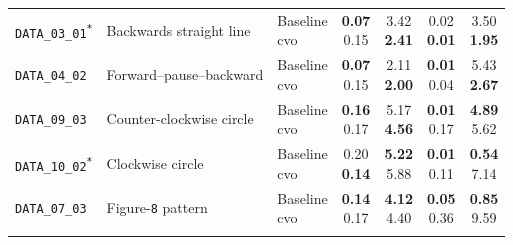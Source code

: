 \documentclass[report.tex]{subfiles}
\begin{document}
\begin{table}[!htbp]
\begin{tabularx}{\textwidth}{
            >{\raggedright\arraybackslash}m{1.55cm}
            >{\raggedright\arraybackslash}X
            l
            cccc
        }
            \texttt{DATA\_03\_01\textsuperscript{*}}
            & Backwards straight line
            & \makecell[l]{Baseline\\\gls{cvo}}
            & \makecell{\textbf{0.07}\\0.15}
            & \makecell{3.42\\\textbf{2.41}}
            & \makecell{0.02\\\textbf{0.01}}
            & \makecell{3.50\\\textbf{1.95}} \\
            \addlinespace

            \texttt{DATA\_04\_02}
            & Forward--pause--backward
            & \makecell[l]{Baseline\\\gls{cvo}}
            & \makecell{\textbf{0.07}\\0.15}
            & \makecell{2.11\\\textbf{2.00}}
            & \makecell{\textbf{0.01}\\0.04}
            & \makecell{5.43\\\textbf{2.67}} \\
            \addlinespace

            \texttt{DATA\_09\_03}
            & Counter-clockwise circle
            & \makecell[l]{Baseline\\\gls{cvo}}
            & \makecell{\textbf{0.16}\\0.17}
            & \makecell{5.17\\\textbf{4.56}}
            & \makecell{\textbf{0.01}\\0.17}
            & \makecell{\textbf{4.89}\\5.62} \\
            \addlinespace

            \texttt{DATA\_10\_02\textsuperscript{*}}
            & Clockwise circle
            & \makecell[l]{Baseline\\\gls{cvo}}
            & \makecell{0.20\\\textbf{0.14}}
            & \makecell{\textbf{5.22}\\5.88}
            & \makecell{\textbf{0.01}\\0.11}
            & \makecell{\textbf{0.54}\\7.14} \\
            \addlinespace

            \texttt{DATA\_07\_03}
            & Figure-\texttt{8} pattern
            & \makecell[l]{Baseline\\\gls{cvo}}
            & \makecell{\textbf{0.14}\\0.17}
            & \makecell{\textbf{4.12}\\4.40}
            & \makecell{\textbf{0.05}\\0.36}
            & \makecell{\textbf{0.85}\\9.59} \\
            \addlinespace


\end{tabularx}
\end{table}
\end{document}
